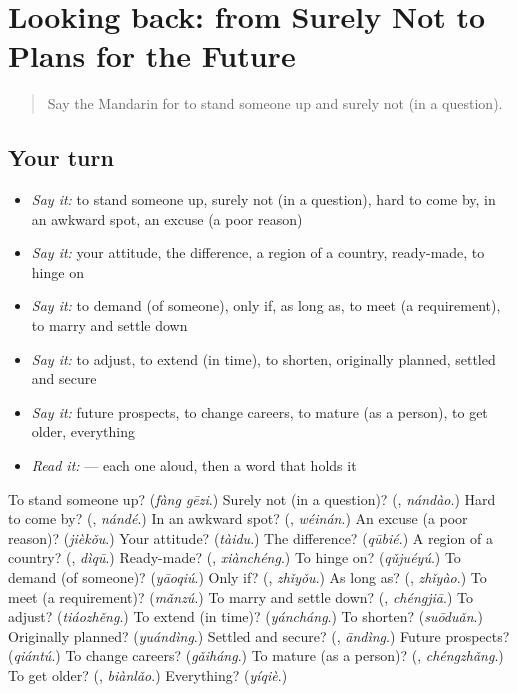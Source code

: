 \section[(dialogue)]{Looking back: from Surely Not to Plans for the Future}

\label{lesson:ZH-R401-review-397-401}



\begin{quote}
Say the Mandarin for to stand someone up and surely not (in a question).
\end{quote}

\subsection*{Your turn}
\begin{itemize}
\raggedright
  \item \emph{Say it:} to stand someone up, surely not (in a question), hard to come by, in an awkward spot, an excuse (a poor reason)
  \item \emph{Say it:} your attitude, the difference, a region of a country, ready-made, to hinge on
  \item \emph{Say it:} to demand (of someone), only if, as long as, to meet (a requirement), to marry and settle down
  \item \emph{Say it:} to adjust, to extend (in time), to shorten, originally planned, settled and secure
  \item \emph{Say it:} future prospects, to change careers, to mature (as a person), to get older, everything
  \item \emph{Read it:}   — each one aloud, then a word that holds it
\end{itemize}

\begin{tcolorbox}[breakable,colback=teal!4,colframe=teal!35!black,title={Before you move on}]
To stand someone up? (\emph{fàng gēzi}.) Surely not (in a question)? (\textbf{}, \emph{nándào}.) Hard to come by? (\textbf{}, \emph{nándé}.) In an awkward spot? (\textbf{}, \emph{wéinán}.) An excuse (a poor reason)? (\emph{jièkǒu}.) Your attitude? (\emph{tàidu}.) The difference? (\emph{qūbié}.) A region of a country? (\textbf{}, \emph{dìqū}.) Ready-made? (\textbf{}, \emph{xiànchéng}.) To hinge on? (\emph{qǔjuéyú}.) To demand (of someone)? (\emph{yāoqiú}.) Only if? (\textbf{}, \emph{zhǐyǒu}.) As long as? (\textbf{}, \emph{zhǐyào}.) To meet (a requirement)? (\emph{mǎnzú}.) To marry and settle down? (\textbf{}, \emph{chéngjiā}.) To adjust? (\emph{tiáozhěng}.) To extend (in time)? (\emph{yáncháng}.) To shorten? (\emph{suōduǎn}.) Originally planned? (\emph{yuándìng}.) Settled and secure? (\textbf{}, \emph{āndìng}.) Future prospects? (\emph{qiántú}.) To change careers? (\emph{gǎiháng}.) To mature (as a person)? (\textbf{}, \emph{chéngzhǎng}.) To get older? (\textbf{}, \emph{biànlǎo}.) Everything? (\emph{yíqiè}.)
\end{tcolorbox}
